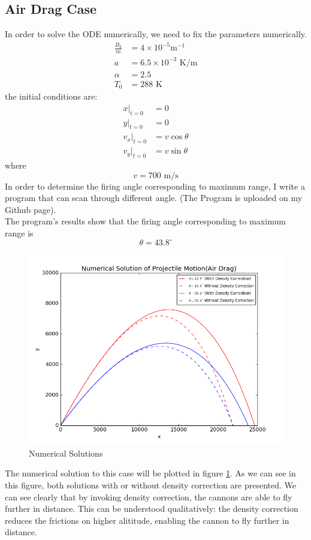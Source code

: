 \documentclass[10pt,a4paper]{article}
\begin{document}
   \subsection{Air Drag Case}
   In order to solve the ODE numerically, we need to fix the parameters numerically.
   \begin{align}
   \frac{B_2}{m}&=4\times 10^{-5}\text{m}^{-1}\\
   a&=6.5\times 10^{-3}\text{ K}/\text{m}\\
   \alpha&=2.5\\
   T_{0}&=288\text{ K}
   \end{align}
   the initial conditions are:
   \begin{align}
   x|_{t=0}&=0\\
   y|_{t=0}&=0\\
   v_x|_{t=0}&=v\cos{\theta}\\
   v_y|_{t=0}&=v\sin{\theta}
   \end{align}
   where
   \begin{equation}
   v=700\text{ m}/\text{s}
   \end{equation}
   In order to determine the firing angle corresponding to maximum range, I write a program that can scan through different angle. (The Program is uploaded on my Github page).\\ 
   The program's results show that the firing angle corresponding to maximum range is
   \begin{equation}
   \theta=43.8^\circ
   \end{equation} 
   
    \begin{figure}[htbp]
    	\centering
    	\includegraphics[width=5in]{Air_Drag.png}
    	\caption{Numerical Solutions\label{Figure_2}}
    \end{figure}
     The numerical solution to this case will be plotted in figure \ref{Figure_2}.
    As we can see in this figure, both solutions with or without density correction are presented. We can see clearly that by invoking density correction, the cannons are able to fly further in distance. This can be understood qualitatively: the density correction reduces the frictions on higher alititude, enabling the cannon to fly further in distance.
    
\end{document}
